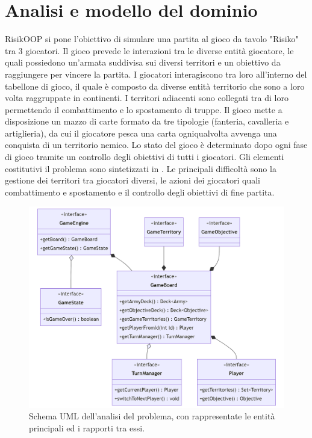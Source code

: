 \documentclass[a4paper,12pt]{report}
\begin{document}
\section{Analisi e modello del dominio}
RisikOOP si pone l'obiettivo di simulare una partita al gioco da tavolo "Risiko" tra 3 giocatori. Il gioco prevede le interazioni tra le diverse entit\`a giocatore, le quali possiedono un'armata suddivisa sui diversi territori e un obiettivo da raggiungere per vincere la partita. I giocatori interagiscono tra loro all'interno del tabellone di gioco, il quale \`e composto da diverse entit\`a territorio che sono a loro volta raggruppate in continenti. I territori adiacenti sono collegati tra di loro permettendo il combattimento e lo spostamento di truppe. Il gioco mette a disposizione un mazzo di carte formato da tre tipologie (fanteria, cavalleria e artiglieria), da cui il giocatore pesca una carta ogniqualvolta avvenga una conquista di un territorio nemico. Lo stato del gioco \`e determinato dopo ogni fase di gioco tramite un controllo degli obiettivi di tutti i giocatori. Gli elementi costitutivi il problema sono sintetizzati in . Le principali difficolt\`a sono la gestione dei territori tra giocatori diversi, le azioni dei giocatori quali combattimento e spostamento e il controllo degli obiettivi di fine partita.
%
\begin{figure}[H]
\centering{}
\includegraphics[width=\textwidth]{img/Model.png}
\caption{Schema UML dell'analisi del problema, con rappresentate le entit\`a principali ed i rapporti tra essi.}
\label{Dominio}
\end{figure}
%
\end{document}
